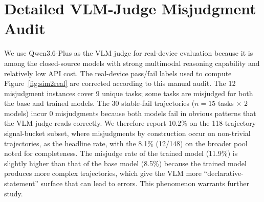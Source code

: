 \section{Detailed VLM-Judge Misjudgment Audit}\label{app:vlm-audit}

\begin{table}[!htbp]
  \centering\small
  \setlength{\tabcolsep}{4pt}
  \caption{Manual review of real-device VLM-judge misjudgments on the 59-task signal-bucket subset (118 trajectories = 59 tasks $\times$ 2 models). The 30 stable-fail trajectories (15 tasks $\times$ 2 models) incur 0 misjudgments and are not included in the rate; including them would dilute the rate to 12/148 = 8.1\%.}
  \label{tab:vlm-judge}
\end{table}

We use Qwen3.6-Plus as the VLM judge for real-device evaluation because it is among the closed-source models with strong multimodal reasoning capability and relatively low API cost. The real-device pass/fail labels used to compute Figure~\ref{fig:sim2real} are corrected according to this manual audit. The 12 misjudgment instances cover 9 unique tasks; some tasks are misjudged for both the base and trained models. The 30 stable-fail trajectories ($n=15$ tasks $\times$ 2 models) incur 0 misjudgments because both models fail in obvious patterns that the VLM judge reads correctly. We therefore report 10.2\% on the 118-trajectory signal-bucket subset, where misjudgments by construction occur on non-trivial trajectories, as the headline rate, with the 8.1\% (12/148) on the broader pool noted for completeness. The misjudge rate of the trained model (11.9\%) is slightly higher than that of the base model (8.5\%) because the trained model produces more complex trajectories, which give the VLM more ``declarative-statement'' surface that can lead to errors. This phenomenon warrants further study.

